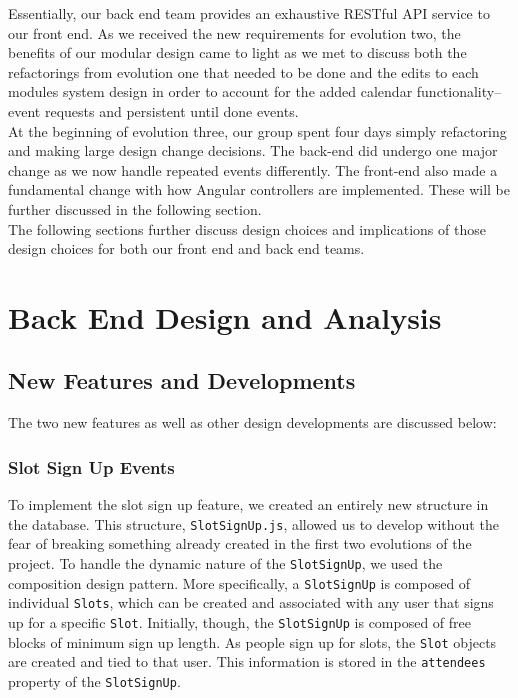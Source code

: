 \documentclass[11pt]{article}   %
\begin{document}
\noindent Essentially, our back end team provides an exhaustive RESTful API service to our front end. As we received the new requirements for evolution two, the benefits of our modular design came to light as we met to discuss both the refactorings from evolution one that needed to be done and the edits to each modules system design in order to account for the added calendar functionality--event requests and persistent until done events.\\

\noindent At the beginning of evolution three, our group spent four days simply refactoring and making large design change decisions. The back-end did undergo one major change as we now handle repeated events differently. The front-end also made a fundamental change with how Angular controllers are implemented. These will be further discussed in the following section.\\

\noindent The following sections further discuss design choices and implications of those design choices for both our front end and back end teams. \\

\section{Back End Design and Analysis}
\subsection{New Features and Developments}
The two new features as well as other design developments are discussed below:
\subsubsection{Slot Sign Up Events}
To implement the slot sign up feature, we created an entirely new structure in the database. This structure, \texttt{SlotSignUp.js}, allowed us to develop without the fear of breaking something already created in the first two evolutions of the project. To handle the dynamic nature of the \texttt{SlotSignUp}, we used the composition design pattern. More specifically, a \texttt{SlotSignUp} is composed of individual \texttt{Slots}, which can be created and associated with any user that signs up for a specific \texttt{Slot}. Initially, though, the \texttt{SlotSignUp} is composed of free blocks of minimum sign up length. As people sign up for slots, the \texttt{Slot} objects are created and tied to that user. This information is stored in the \texttt{attendees} property of the \texttt{SlotSignUp}. \\
\end{document}
